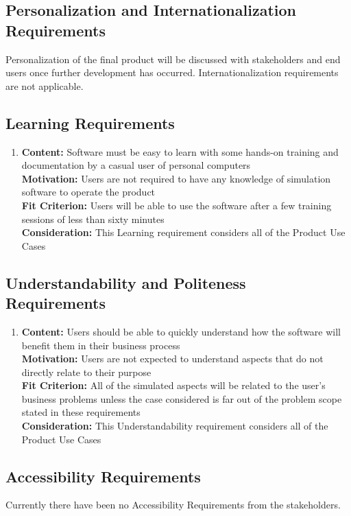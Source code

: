 \documentclass[paper=letter, fontsize=10pt]{scrartcl}
\numberwithin{equation}{section}		%
\numberwithin{figure}{section}			%
\numberwithin{table}{section}				%
\begin{document}
\subsection{Personalization and Internationalization Requirements}
Personalization of the final product will be discussed with stakeholders and end users once further development has occurred. Internationalization requirements are not applicable.
\subsection{Learning Requirements}
\begin{enumerate}
	\item \textbf{Content:} Software must be easy to learn with some hands-on training and documentation by a casual user of personal computers
	\\	  \textbf{Motivation:} Users are not required to have any knowledge of simulation software to operate the product
	\\	  \textbf{Fit Criterion:} Users will be able to use the software after a few training sessions of less than sixty minutes	\\	  \textbf{Consideration:} This Learning requirement considers all of the Product Use Cases
\end{enumerate}
\subsection{Understandability and Politeness Requirements}
\begin{enumerate}
	\item \textbf{Content:} Users should be able to quickly understand how the software will benefit them in their business process
	\\	  \textbf{Motivation:} Users are not expected to understand aspects that do not directly relate to their purpose
	\\	  \textbf{Fit Criterion:} All of the simulated aspects will be related to the user's business problems unless the case considered is far out of the problem scope stated in these requirements
	\\	  \textbf{Consideration:} This Understandability requirement considers all of the Product Use Cases	
\end{enumerate}
\subsection{Accessibility Requirements}
Currently there have been no Accessibility Requirements from the stakeholders.
\end{document}
